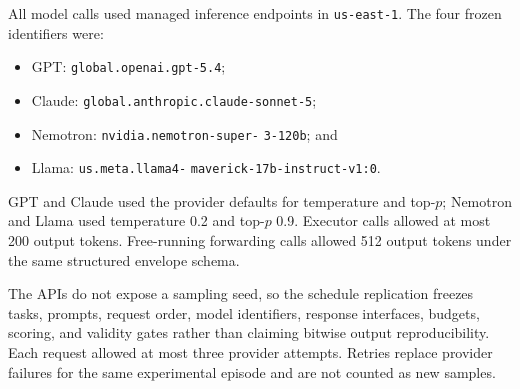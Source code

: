 \documentclass[11pt]{article}
\begin{document}
All model calls used managed inference endpoints in \texttt{us-east-1}. The
four frozen identifiers were:
\begin{itemize}
  \item GPT: \nolinkurl{global.openai.gpt-5.4};
  \item Claude: \nolinkurl{global.anthropic.claude-sonnet-5};
  \item Nemotron: \texttt{nvidia.nemotron-super-}\allowbreak
  \texttt{3-120b}; and
  \item Llama: \texttt{us.meta.llama4-}\allowbreak
  \texttt{maverick-17b-instruct-v1:0}.
\end{itemize}
GPT and Claude used the provider defaults for temperature and top-$p$;
Nemotron and Llama used temperature 0.2 and top-$p$ 0.9. Executor calls allowed
at most 200 output tokens. Free-running forwarding calls allowed 512 output
tokens under the same structured envelope schema.

The APIs do not expose a sampling seed, so the schedule replication freezes
tasks, prompts, request order, model identifiers, response interfaces, budgets,
scoring, and validity gates rather than claiming bitwise output
reproducibility. Each request allowed at most three provider attempts. Retries
replace provider failures for the same experimental episode and are not counted
as new samples.
\end{document}
